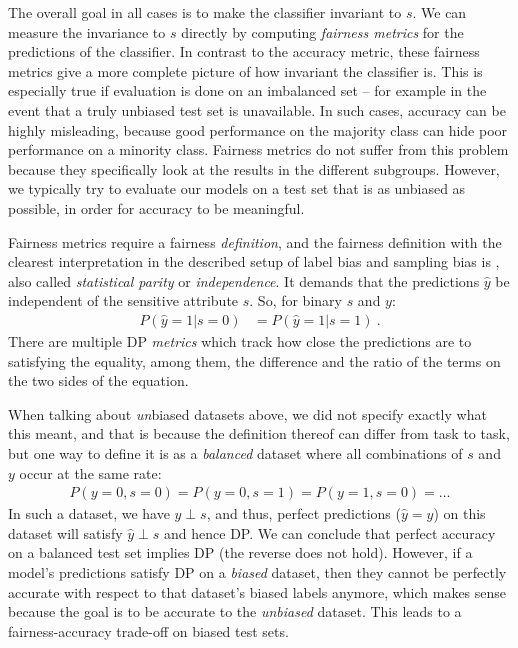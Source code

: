 The overall goal in all cases is to make the classifier invariant to $s$.
We can measure the invariance to $s$ directly by computing \emph{fairness metrics}
for the predictions of the classifier.
In contrast to the accuracy metric,
these fairness metrics give a more complete picture of how invariant the classifier is.
This is especially true if evaluation is done on an imbalanced set
-- for example in the event that a truly unbiased test set is unavailable.
In such cases, accuracy can be highly misleading,
because good performance on the majority class can hide poor performance on a minority class.
Fairness metrics do not suffer from this problem
because they specifically look at the results in the different subgroups.
However, we typically try to evaluate our models on a test set that is as unbiased as possible,
in order for accuracy to be meaningful.

Fairness metrics require a fairness \emph{definition},
and the fairness definition with the clearest interpretation in the described setup of label bias and sampling bias is ,
also called \emph{statistical parity} or \emph{independence}.
It demands that the predictions $\hat{y}$ be independent of the sensitive attribute \(s\).
So, for binary $s$ and $y$:
\begin{align}
  P(\hat{y}=1|s=0) &= P(\hat{y}=1|s=1)~.
  \label{eq:dp-def}
\end{align}
There are multiple \ac{DP} \emph{metrics} which track how close the predictions are to satisfying the equality,
among them, the difference and the ratio of the terms on the two sides of the equation.

When talking about \emph{un}biased datasets above,
we did not specify exactly what this meant,
and that is because the definition thereof can differ from task to task,
but one way to define it is as a \emph{balanced} dataset where all combinations of $s$ and $y$ occur at the same rate:
\begin{align}
  \label{eq:balanced-dataset}
  P(y=0,s=0)=P(y=0,s=1)=P(y=1,s=0)=\dots
\end{align}
In such a dataset, we have $y \perp s$, and thus,
perfect predictions ($\hat{y}=y$) on this dataset will satisfy $\hat{y} \perp s$ and hence \ac{DP}.
We can conclude that perfect accuracy on a balanced test set implies \acl{DP}
(the reverse does not hold).
However, if a model's predictions satisfy \ac{DP} on a \emph{biased} dataset,
then they cannot be perfectly accurate with respect to that dataset's biased labels anymore,
which makes sense because the goal is to be accurate to the \emph{unbiased} dataset.
This leads to a fairness-accuracy trade-off on biased test sets.

